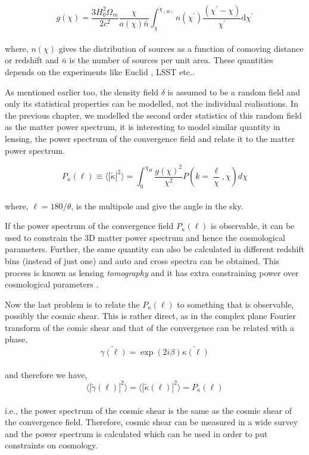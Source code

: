 \begin{equation}
	g(\chi) = \dfrac{3H_0^2\Omega_m}{2c^2} \dfrac{\chi}{a(\chi)\bar{n}} \int_{\chi}^{\chi_(H)}
					n(\chi^{\prime})
					\dfrac{(\chi^{\prime}-\chi)}{\chi^{\prime}}\mathrm{d}\chi^{\prime}
\end{equation}
\\
where, $n(\chi)$ gives the distribution of sources as a function of comoving distance or redshift
and $\bar{n}$ is the number of sources per unit area. These quantities depends on the
experiments like Euclid \cite{2013LRR....16....6A}, LSST \cite{2009arXiv0912.0201L} etc..

As mentioned earlier too, the density field $\delta$ is assumed to be a random field
and only its statistical properties can be modelled, not the individual realisations. 
In the previous chapter, we modelled the second order statistics of this random field
as the matter power spectrum, it is interesting to model similar quantity in lensing,
the power spectrum of the convergence field and relate it to the matter power spectrum.


\begin{equation}
	P_{\kappa}(\ell) \equiv \langle |\tilde{\kappa}|^2 \rangle = 
			\int_0^{\chi_H} \dfrac{g(\chi)^2}{\chi^2} 
			P\left(k=\dfrac{\ell}{\chi},\chi \right) d\chi
\end{equation}
\\
where, $\ell = 180/\theta$, is the multipole and give the angle in the sky. 

If the power spectrum of the convergence field $P_{\kappa}(\ell)$ is observable, it can be
used to constrain the 3D matter power spectrum and hence the cosmological parameters. Further,
the same quantity can also be calculated in different redshift bins (instead of just one) and
auto and cross spectra can be obtained. This process is known as 
lensing {\it tomography} and it has extra constraining power over cosmological parameters
\cite{1999ApJ...522L..21H,2004MNRAS.348..897T}.

Now the last problem is to relate the $P_{\kappa}(\ell)$ to something that is observable, 
possibly the cosmic shear. This is rather direct, as in the complex plane Fourier transform
of the comic shear and that of the
convergence can be related with a phase,
\begin{equation}
	\tilde{\gamma(\ell)} = \exp(2i\beta) \tilde{\kappa(\ell)}
\end{equation}
\\
and therefore we have,
\begin{equation}
	\langle |\tilde{\gamma}(\ell)|^2 \rangle = 
	\langle |\tilde{\kappa}(\ell)|^2 \rangle = P_{\kappa}(\ell)
\end{equation}
\\
i.e., the power spectrum of the cosmic shear is the same as the cosmic shear of the
convergence field. Therefore, cosmic shear can be measured in a wide survey and the 
power spectrum is calculated which can be used in order to put constraints on
cosmology.


